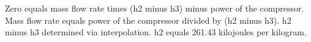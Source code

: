 Zero equals mass flow rate times (h2 minus h3) minus power of the compressor.  
Mass flow rate equals power of the compressor divided by (h2 minus h3).  
h2 minus h3 determined via interpolation.  
h2 equals 261.43 kilojoules per kilogram.